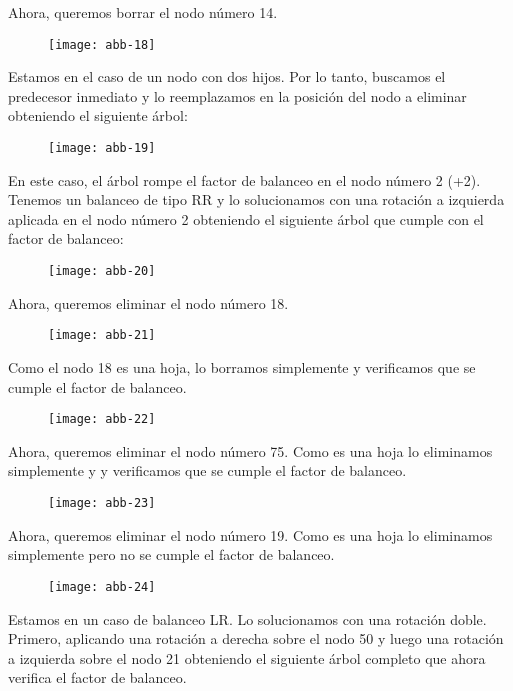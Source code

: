 \documentclass[10pt,a4paper]{article}
\begin{document}
Ahora, queremos borrar el nodo número 14.

\begin{figure}[h]
	\centering
\texttt{[image: abb-18]}
	\label{drivers1}
\end{figure}
\newpage
Estamos en el caso de un nodo con dos hijos. Por lo tanto, buscamos el predecesor inmediato y lo reemplazamos en la posición del nodo a eliminar obteniendo el siguiente árbol:

\begin{figure}[h]
	\centering
\texttt{[image: abb-19]}
	\label{drivers1}
\end{figure}

En este caso, el árbol rompe el factor de balanceo en el nodo número 2 (+2). Tenemos un balanceo de tipo RR y lo solucionamos con una rotación a izquierda aplicada en el nodo número 2 obteniendo el siguiente árbol que cumple con el factor de balanceo:

\begin{figure}[h]
	\centering
\texttt{[image: abb-20]}
	\label{drivers1}
\end{figure}
\newpage
Ahora, queremos eliminar el nodo número 18.

\begin{figure}[h]
	\centering
\texttt{[image: abb-21]}
	\label{drivers1}
\end{figure}

Como el nodo 18 es una hoja, lo borramos simplemente y verificamos que se cumple el factor de balanceo.

\begin{figure}[h]
	\centering
\texttt{[image: abb-22]}
	\label{drivers1}
\end{figure}
\newpage
Ahora, queremos eliminar el nodo número 75. Como es una hoja lo eliminamos simplemente y y verificamos que se cumple el factor de balanceo.

\begin{figure}[h]
	\centering
\texttt{[image: abb-23]}
	\label{drivers1}
\end{figure} 

Ahora, queremos eliminar el nodo número 19. Como es una hoja lo eliminamos simplemente pero no se cumple el factor de balanceo.

\begin{figure}[h]
	\centering
\texttt{[image: abb-24]}
	\label{drivers1}
\end{figure} 
\newpage
Estamos en un caso de balanceo LR. Lo solucionamos con una rotación doble. Primero, aplicando una rotación a derecha sobre el nodo 50 y luego una rotación a izquierda sobre el nodo 21 obteniendo el siguiente árbol completo que ahora verifica el factor de balanceo.
\end{document}

